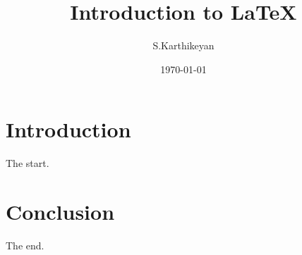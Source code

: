 \documentclass[a4paper, 11pt]{article}
\author{S.Karthikeyan}
\title{Introduction to \LaTeX}
\date{\today}
\begin{document}
	\maketitle
	\section{Introduction}
		The start.
	\section{Conclusion}
		The end.
\end{document}
